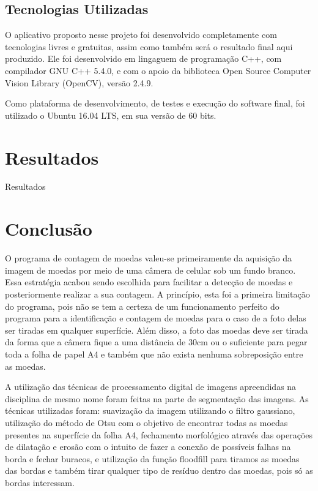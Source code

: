 \documentclass[10pt,journal,compsoc]{IEEEtran}
\begin{document}
\subsection{Tecnologias Utilizadas}
\label{sec:metodologia:tecnologias-envolvidas}

O aplicativo proposto nesse projeto foi desenvolvido completamente com tecnologias livres e gratuitas, assim como também será o resultado final aqui produzido. Ele foi desenvolvido em lingaguem de programação C++, com compilador GNU C++ 5.4.0, e com o apoio da biblioteca Open Source Computer Vision Library (OpenCV), versão 2.4.9. 

Como plataforma de desenvolvimento, de testes e execução do software final, foi utilizado o Ubuntu 16.04 LTS, em sua versão de 60 bits.

\section{Resultados}
\label{sec:resultados}

Resultados

\section{Conclusão}
\label{sec:conclusao}

O programa de contagem de moedas valeu-se primeiramente da aquisição da imagem de moedas por meio de uma câmera de celular sob um fundo branco. Essa estratégia acabou sendo escolhida para facilitar a detecção de moedas e posteriormente realizar a sua contagem. A princípio, esta foi a primeira limitação do programa, pois não se tem a certeza de um funcionamento perfeito do programa para a identificação e contagem de moedas para o caso de a foto delas ser tiradas em qualquer superfície. Além disso, a foto das moedas deve ser tirada da forma que a câmera fique a uma distância de 30cm ou o suficiente para pegar toda a folha de papel A4 e também que não exista nenhuma sobreposição entre as moedas.

A utilização das técnicas de processamento digital de imagens apreendidas na disciplina de mesmo nome foram feitas na parte de segmentação das imagens. As técnicas utilizadas foram: suavização da imagem utilizando o filtro gaussiano, utilização do método de Otsu com o objetivo de encontrar todas as moedas presentes na superfície da folha A4, fechamento morfológico através das operações de dilatação e erosão com o intuito de fazer a conexão de possíveis falhas na borda e fechar buracos, e utilização da função floodfill para tiramos as moedas das bordas e também tirar qualquer tipo de resíduo dentro das moedas, pois só as bordas interessam.
\end{document}
